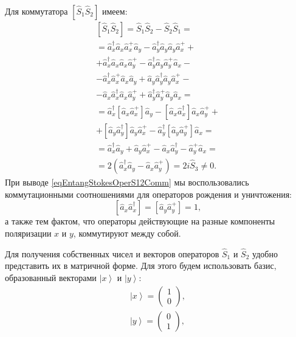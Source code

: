 Для коммутатора $\left[\hat{S}_1\hat{S}_2\right]$ имеем:
\begin{eqnarray}
\left[\hat{S}_1\hat{S}_2\right] = \hat{S}_1\hat{S}_2 -
\hat{S}_2\hat{S}_1 = 
\nonumber \\
=
\hat{a}_x^{\dag}\hat{a}_x\hat{a}_x^{+}\hat{a}_y -
\hat{a}_y^{\dag}\hat{a}_y\hat{a}_y\hat{a}_x^{+} + 
\nonumber \\
+ \hat{a}_x^{\dag}\hat{a}_x\hat{a}_x\hat{a}_y^{+} -
\hat{a}_y^{\dag}\hat{a}_y\hat{a}_y^{+}\hat{a}_x -
\nonumber \\
- \hat{a}_x^{\dag}\hat{a}_x^{+}\hat{a}_x\hat{a}_y +
\hat{a}_y\hat{a}_y^{\dag}\hat{a}_y\hat{a}_x^{+} -
\nonumber \\
- \hat{a}_x\hat{a}_x^{\dag}\hat{a}_x\hat{a}_y^{+} +
\hat{a}_y^{\dag}\hat{a}_y^{+}\hat{a}_y\hat{a}_x =
\nonumber \\
= \hat{a}_x^{\dag}\left[\hat{a}_x\hat{a}_x^{+}\right]\hat{a}_y -
\left[\hat{a}_x\hat{a}_x^{\dag}\right]\hat{a}_x\hat{a}_y^{+} +
\nonumber \\
+\left[\hat{a}_y\hat{a}_y^{\dag}\right]\hat{a}_y\hat{a}_x^{+} -
\hat{a}_y^{\dag}\left[\hat{a}_y\hat{a}_y^{+}\right]\hat{a}_x =
\nonumber \\
= \hat{a}_x^{\dag}\hat{a}_y + \hat{a}_y\hat{a}_x^{+} -
\hat{a}_x\hat{a}_y^{\dag} - \hat{a}_y^{+}\hat{a}_x = 
\nonumber \\
= 2 \left(\hat{a}_x^{\dag}\hat{a}_y - \hat{a}_x\hat{a}_y^{+}\right) = 2 i
\hat{S}_3 \ne 0.
\label{eqEntangStokesOperS12Comm}
\end{eqnarray}
При выводе \eqref{eqEntangStokesOperS12Comm} мы воспользовались
коммутационными соотношениями для операторов рождения и уничтожения:
\begin{equation}
\left[\hat{a}_x \hat{a}^{\dag}_x\right] = \left[\hat{a}_y \hat{a}^{+}_y\right] = 1,
\nonumber
\end{equation}
а также тем фактом, что операторы действующие на разные компоненты
поляризации $x$ и $y$, коммутируют между собой.

Для получения собственных чисел и векторов операторов $\hat{S}_1$ и
$\hat{S}_2$ удобно представить их в матричной форме. Для этого будем
использовать базис, образованный векторами $\left|x\right>$ и
$\left|y\right>$:
\begin{eqnarray}
\left|x\right> = \left(
\begin{array}{c}
1 \\
0
\end{array}
\right),
\nonumber \\
\left|y\right> = \left(
\begin{array}{c}
0 \\
1
\end{array}
\right),
\nonumber
\end{eqnarray}

